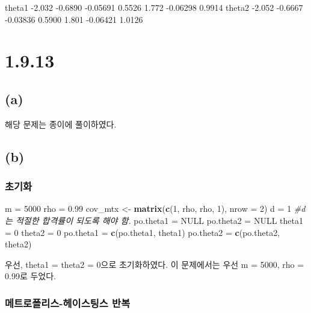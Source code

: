 \documentclass[
]{article}
\newenvironment{Shaded}{\begin{snugshade}}{\end{snugshade}}
\newcommand{\AttributeTok}[1]{\textcolor[rgb]{0.13,0.29,0.53}{#1}}
\newcommand{\CommentTok}[1]{\textcolor[rgb]{0.56,0.35,0.01}{\textit{#1}}}
\newcommand{\ConstantTok}[1]{\textcolor[rgb]{0.56,0.35,0.01}{#1}}
\newcommand{\DecValTok}[1]{\textcolor[rgb]{0.00,0.00,0.81}{#1}}
\newcommand{\FloatTok}[1]{\textcolor[rgb]{0.00,0.00,0.81}{#1}}
\newcommand{\FunctionTok}[1]{\textcolor[rgb]{0.13,0.29,0.53}{\textbf{#1}}}
\newcommand{\NormalTok}[1]{#1}
\newcommand{\OtherTok}[1]{\textcolor[rgb]{0.56,0.35,0.01}{#1}}
\begin{document}
theta1 -2.032 -0.6890 -0.05691 0.5526 1.772 -0.06298 0.9914 theta2
-2.052 -0.6667 -0.03836 0.5900 1.801 -0.06421 1.0126

\section{1.9.13}\label{section-1}

\subsection{(a)}\label{a-1}

해당 문제는 종이에 풀이하였다.

\subsection{(b)}\label{b-1}

\subsubsection{초기화}\label{uxcd08uxae30uxd654-1}

\begin{Shaded}
\begin{Highlighting}[]
\NormalTok{m }\OtherTok{=} \DecValTok{5000}
\NormalTok{rho }\OtherTok{=} \FloatTok{0.99}
\NormalTok{cov\_mtx }\OtherTok{\textless{}{-}} \FunctionTok{matrix}\NormalTok{(}\FunctionTok{c}\NormalTok{(}\DecValTok{1}\NormalTok{, rho, rho, }\DecValTok{1}\NormalTok{), }\AttributeTok{nrow =} \DecValTok{2}\NormalTok{)}
\NormalTok{d }\OtherTok{=} \DecValTok{1} \CommentTok{\#d는 적절한 합격률이 되도록 해야 함. }
\NormalTok{po.theta1 }\OtherTok{=} \ConstantTok{NULL}
\NormalTok{po.theta2 }\OtherTok{=} \ConstantTok{NULL}
\NormalTok{theta1 }\OtherTok{=} \DecValTok{0}
\NormalTok{theta2 }\OtherTok{=} \DecValTok{0}
\NormalTok{po.theta1 }\OtherTok{=} \FunctionTok{c}\NormalTok{(po.theta1, theta1)}
\NormalTok{po.theta2 }\OtherTok{=} \FunctionTok{c}\NormalTok{(po.theta2, theta2) }
\end{Highlighting}
\end{Shaded}

우선, theta1 = theta2 = 0으로 초기화하였다. 이 문제에서는 우선 m = 5000,
rho = 0.99로 두었다.

\subsubsection{메트로폴리스-헤이스팅스
반복}\label{uxba54uxd2b8uxb85cuxd3f4uxb9acuxc2a4-uxd5e4uxc774uxc2a4uxd305uxc2a4-uxbc18uxbcf5-1}
\end{document}
